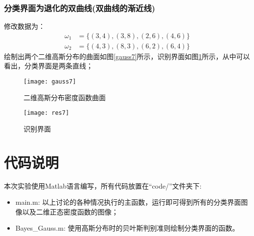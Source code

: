 \documentclass[cn]{elegantbook}
\begin{document}
\subsection{分类界面为退化的双曲线(双曲线的渐近线)}
修改数据为：
\begin{equation}
\begin{aligned}
\omega_1&=\{(3,4),(3,8),(2,6),(4,6)\} \\
\omega_2&=\{(4,3),(8,3),(6,2),(6,4)\}
\end{aligned}
\end{equation}
绘制出两个二维高斯分布的曲面如图\ref{gauss7}所示，识别界面如图\ref{res7}所示，从中可以看出，分类界面是两条直线；
\begin{figure}[!h]
	\centering
	\begin{minipage}{0.48\linewidth}
		\centering
		\texttt{[image: gauss7]}
		\caption{\label{gauss7}二维高斯分布密度函数曲面}
	\end{minipage}
	\begin{minipage}{0.48\linewidth}
		\centering
		\texttt{[image: res7]}
		\caption{\label{res7}识别界面}
	\end{minipage}
\end{figure}

\chapter{代码说明}
\noindent 本次实验使用Matlab语言编写，所有代码放置在“code/”文件夹下:
\begin{itemize}
	\item main.m: 以上讨论的各种情况执行的主函数，运行即可得到所有的分类界面图像以及二维正态密度函数的图像；
	\item Bayes\_Gauss.m: 使用高斯分布时的贝叶斯判别准则绘制分类界面的函数。
\end{itemize}
\end{document}
